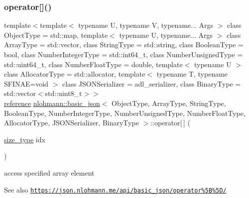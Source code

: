 \subsubsection{\texorpdfstring{operator[]()}{operator[]()}\hspace{0.1cm}{\footnotesize\ttfamily [1/8]}}
{\footnotesize\ttfamily template$<$template$<$ typename U, typename V, typename... Args $>$ class Object\+Type = std\+::map, template$<$ typename U, typename... Args $>$ class Array\+Type = std\+::vector, class String\+Type  = std\+::string, class Boolean\+Type  = bool, class Number\+Integer\+Type  = std\+::int64\+\_\+t, class Number\+Unsigned\+Type  = std\+::uint64\+\_\+t, class Number\+Float\+Type  = double, template$<$ typename U $>$ class Allocator\+Type = std\+::allocator, template$<$ typename T, typename S\+F\+I\+N\+A\+E=void $>$ class J\+S\+O\+N\+Serializer = adl\+\_\+serializer, class Binary\+Type  = std\+::vector$<$std\+::uint8\+\_\+t$>$$>$ \\
\hyperlink{classnlohmann_1_1basic__json_a220ae98554a76205fb7f8822d36b2d5a}{reference} \hyperlink{classnlohmann_1_1basic__json}{nlohmann\+::basic\+\_\+json}$<$ Object\+Type, Array\+Type, String\+Type, Boolean\+Type, Number\+Integer\+Type, Number\+Unsigned\+Type, Number\+Float\+Type, Allocator\+Type, J\+S\+O\+N\+Serializer, Binary\+Type $>$\+::operator\mbox{[}$\,$\mbox{]} (\begin{DoxyParamCaption}\item[{\hyperlink{classnlohmann_1_1basic__json_a3ada29bca70b4965f6fd37ec1c8f85f7}{size\+\_\+type}}]{idx }\end{DoxyParamCaption})\hspace{0.3cm}{\ttfamily [inline]}}



access specified array element 

\begin{DoxySeeAlso}{See also}
\href{https://json.nlohmann.me/api/basic_json/operator%5B%5D/}{\tt https\+://json.\+nlohmann.\+me/api/basic\+\_\+json/operator\%5\+B\%5\+D/} 
\end{DoxySeeAlso}
\mbox{\label{classnlohmann_1_1basic__json_ad21d96f490fa1aa8605fba8dadcce319}} 
